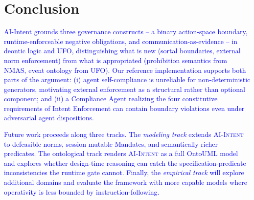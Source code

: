 \documentclass[runningheads]{llncs}
\begin{document}
\section{Conclusion}
\label{sec:conclusion}

\textcolor{blue}{AI-Intent grounds three governance constructs -- a binary action-space boundary, runtime-enforceable negative obligations, and communication-as-evidence -- in deontic logic and UFO, distinguishing what is new (sortal boundaries, external norm enforcement) from what is appropriated (prohibition semantics from NMAS, event ontology from UFO). 
Our reference implementation supports both parts of the argument: (i) agent self-compliance is unreliable for non-deterministic generators, motivating external enforcement as a structural rather than optional component; and (ii) a Compliance Agent realizing the four constitutive requirements of Intent Enforcement can contain boundary violations even under adversarial agent dispositions.}

\textcolor{blue}{Future work proceeds along three tracks. The \textit{modeling track} extends \textsc{AI-Intent} to defeasible norms, session-mutable Mandates, and semantically richer predicates. The ontological track renders \textsc{AI-Intent} as a full OntoUML model and explores whether design-time reasoning can catch the specification-predicate inconsistencies the runtime gate cannot. Finally, the \textit{empirical track} will explore additional domains and evaluate the framework with more capable models where operativity is less bounded by instruction-following.}




\end{document}
